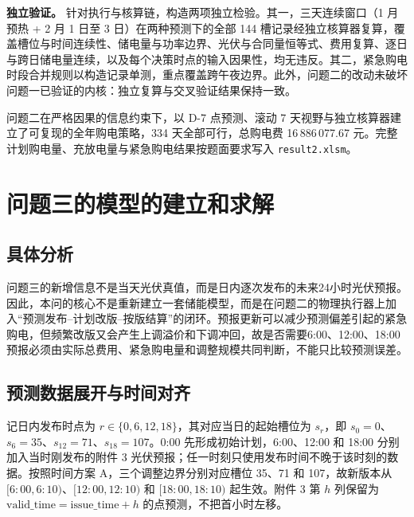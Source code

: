 \documentclass[withoutpreface,bwprint]{cumcmthesis}
\begin{document}
\textbf{独立验证。} 针对执行与核算链，构造两项独立检验。其一，三天连续窗口（1 月预热 + 2 月 1 日至 3 日）在两种预测下的全部 144 槽记录经独立核算器复算，覆盖槽位与时间连续性、储电量与功率边界、光伏与合同量恒等式、费用复算、逐日与跨日储电量连续，以及每个决策时点的输入因果性，均无违反。其二，紧急购电时段合并规则以构造记录单测，重点覆盖跨午夜边界。此外，问题二的改动未破坏问题一已验证的内核：独立复算与交叉验证结果保持一致。

问题二在严格因果的信息约束下，以 D-7 点预测、滚动 7 天视野与独立核算器建立了可复现的全年购电策略，334 天全部可行，总购电费 16\,886\,077.67 元。完整计划购电量、充放电量与紧急购电结果按题面要求写入 \texttt{result2.xlsm}。




























\section{问题三的模型的建立和求解}
\subsection{具体分析}

问题三的新增信息不是当天光伏真值，而是日内逐次发布的未来24小时光伏预报。因此，本问的核心不是重新建立一套储能模型，而是在问题二的物理执行器上加入“预测发布--计划改版--按版结算”的闭环。预报更新可以减少预测偏差引起的紧急购电，但频繁改版又会产生上调溢价和下调冲回，故是否需要6:00、12:00、18:00预报必须由实际总费用、紧急购电量和调整规模共同判断，不能只比较预测误差。

\subsection{预测数据展开与时间对齐}

记日内发布时点为 $r\in\{0,6,12,18\}$，其对应当日的起始槽位为 $s_r$，即 $s_0=0$、$s_6=35$、$s_{12}=71$、$s_{18}=107$。0:00 先形成初始计划，6:00、12:00 和 18:00 分别加入当时刚发布的附件 3 光伏预报；任一时刻只使用发布时间不晚于该时刻的数据。按照时间方案 A，三个调整边界分别对应槽位 35、71 和 107，故新版本从 $[6{:}00,6{:}10)$、$[12{:}00,12{:}10)$ 和 $[18{:}00,18{:}10)$ 起生效。附件 3 第 $h$ 列保留为 $\mathrm{valid\_time}=\mathrm{issue\_time}+h$ 的点预测，不把首小时左移。
\end{document}

